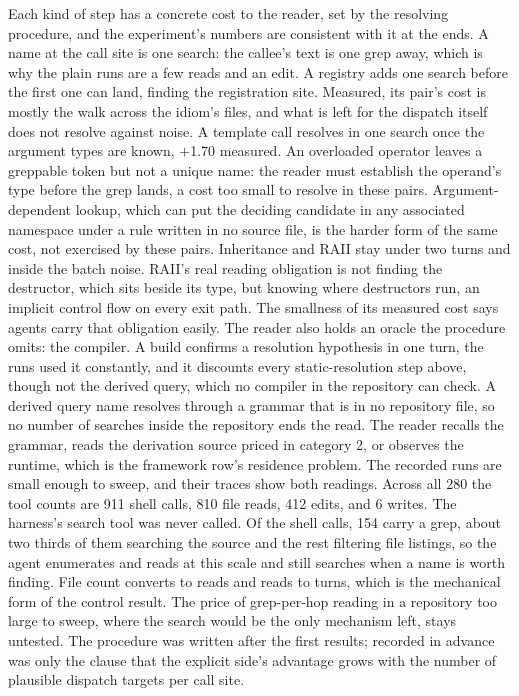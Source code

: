 \documentclass[journal]{IEEEtran}
\begin{document}
Each kind of step has a concrete cost to the reader, set by the
resolving procedure, and the experiment's numbers are consistent with it
at the ends. A name at the call site is one search: the callee's text is one grep
away, which is why the plain runs are a few reads and an edit. A registry
adds one search before the first one can land, finding the registration
site. Measured, its pair's cost is mostly the walk across the idiom's
files, and what is left for the dispatch itself does not resolve against
noise. A template call resolves in one search once the argument types are
known, $+$1.70 measured. An overloaded operator leaves a greppable token
but not a unique name: the reader must establish the operand's type
before the grep lands, a cost too small to resolve in these pairs.
Argument-dependent lookup, which can put the deciding candidate in any
associated namespace under a rule written in no source file, is the
harder form of the same cost, not exercised by these pairs. Inheritance and RAII stay under
two turns and inside the batch noise. RAII's real reading obligation is
not finding the destructor, which sits beside its type, but knowing where
destructors run, an implicit control flow on every exit path. The
smallness of its measured cost says agents carry that obligation easily.
The reader also holds an oracle the
procedure omits: the compiler. A build confirms a resolution hypothesis
in one turn, the runs used it constantly, and it discounts every
static-resolution step above, though not the derived query, which no
compiler in the repository can check. A derived
query name resolves through a grammar that is in no repository file, so no
number of searches inside the repository ends the read. The reader recalls
the grammar, reads the derivation source priced in category 2, or observes
the runtime, which is the framework row's residence problem. The recorded runs are small enough
to sweep, and their traces show both readings. Across all 280 the tool
counts are 911 shell calls, 810 file reads, 412 edits, and 6 writes. The
harness's search tool was never called. Of the shell calls, 154 carry a
grep, about two thirds of them searching the source and the rest
filtering file listings, so the agent enumerates and reads at this scale
and still searches when a name is worth finding. File count converts
to reads and reads to turns, which is the mechanical form of the control
result. The price of grep-per-hop reading in a
repository too large to sweep, where the search would be the only
mechanism left, stays untested. The procedure was written after the first results; recorded in advance
was only the clause that the explicit side's advantage grows with the
number of plausible dispatch targets per call site.
\end{document}
